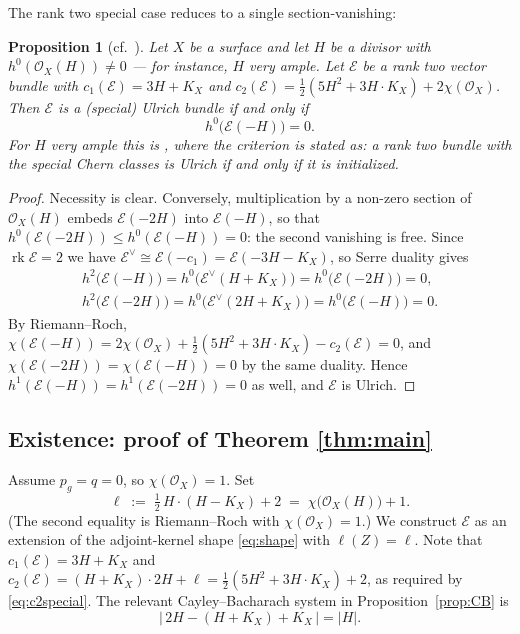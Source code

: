 \documentclass{amsart}
\newtheorem{proposition}[theorem]{Proposition}
\theoremstyle{definition}
\newcommand{\OO}{\mathcal{O}}
\newcommand{\EE}{\mathcal{E}}
\newcommand{\rk}{\operatorname{rk}}
\newcommand{\len}{\ell}
\begin{document}
The rank two special case reduces to a single section-vanishing:

\begin{proposition}[cf.\ {\cite[Prop.~2.1(4) and Cor.~2.4]{Cas17}}]\label{prop:reduction}
Let $X$ be a surface and let $H$ be a divisor with $h^0(\OO_X(H))\neq0$ --- for instance, $H$ very ample. Let $\EE$ be a rank two vector bundle with $c_1(\EE)=3H+K_X$ and $c_2(\EE)=\tfrac12(5H^2+3H\cdot K_X)+2\chi(\OO_X)$. Then $\EE$ is a (special) Ulrich bundle if and only if
\[
h^0\bigl(\EE(-H)\bigr)=0 .
\]
For $H$ very ample this is \cite[Cor.~2.4]{Cas17}, where the criterion is stated as: a rank two bundle with the special Chern classes is Ulrich if and only if it is initialized.
\end{proposition}

\begin{proof}
Necessity is clear. Conversely, multiplication by a non-zero section of $\OO_X(H)$ embeds $\EE(-2H)$ into $\EE(-H)$, so that $h^0(\EE(-2H))\le h^0(\EE(-H))=0$: the second vanishing is free. Since $\rk\EE=2$ we have $\EE^\vee\cong\EE(-c_1)=\EE(-3H-K_X)$, so Serre duality gives
\begin{gather*}
h^2\bigl(\EE(-H)\bigr)=h^0\bigl(\EE^\vee(H+K_X)\bigr)=h^0\bigl(\EE(-2H)\bigr)=0,\\
h^2\bigl(\EE(-2H)\bigr)=h^0\bigl(\EE^\vee(2H+K_X)\bigr)=h^0\bigl(\EE(-H)\bigr)=0 .
\end{gather*}
By Riemann--Roch, $\chi(\EE(-H))=2\chi(\OO_X)+\tfrac12(5H^2+3H\cdot K_X)-c_2(\EE)=0$, and $\chi(\EE(-2H))=\chi(\EE(-H))=0$ by the same duality. Hence $h^1(\EE(-H))=h^1(\EE(-2H))=0$ as well, and $\EE$ is Ulrich.
\end{proof}

\subsection{Existence: proof of Theorem \ref{thm:main}}\label{subsec:existence}
Assume $p_g=q=0$, so $\chi(\OO_X)=1$. Set
\[
\len\;:=\;\tfrac12\,H\cdot(H-K_X)+2\;=\;\chi\bigl(\OO_X(H)\bigr)+1 .
\]
(The second equality is Riemann--Roch with $\chi(\OO_X)=1$.) We construct $\EE$ as an extension of the adjoint-kernel shape \eqref{eq:shape} with $\len(Z)=\len$. Note that $c_1(\EE)=3H+K_X$ and
$c_2(\EE)=(H+K_X)\cdot 2H+\len=\tfrac12(5H^2+3H\cdot K_X)+2$,
as required by \eqref{eq:c2special}. The relevant Cayley--Bacharach system in Proposition~\ref{prop:CB} is
\[
\bigl|\,2H-(H+K_X)+K_X\,\bigr|=|H| .
\]
\end{document}
